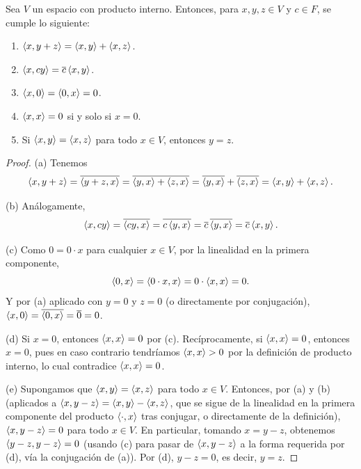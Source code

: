 \documentclass[12pt,a4paper]{book}
\begin{document}
    \begin{teorema}
        Sea $V$ un espacio con producto interno. Entonces, para $x,y,z\in V$ y $c\in F$, se cumple lo siguiente:
        \begin{enumerate}[label=(\alph*)]
            \item $\left\langle x, y+z \right\rangle=\left\langle x, y \right\rangle+\left\langle x, z \right\rangle$.
            \item $\left\langle x, cy \right\rangle=\overline{c}\left\langle x, y \right\rangle$.
            \item $\left\langle x, 0 \right\rangle=\left\langle 0, x \right\rangle=0$.
            \item $\left\langle x, x \right\rangle=0$ si y solo si $x=0$.
            \item Si $\left\langle x, y \right\rangle=\left\langle x, z \right\rangle$ para todo $x\in V$, entonces $y=z$.
        \end{enumerate}
    \end{teorema}

    \begin{proof}
        (a) Tenemos
        \begin{equation*}
            \left\langle x, y+z \right\rangle=\overline{\left\langle y+z, x \right\rangle}=\overline{\left\langle y, x \right\rangle+\left\langle z, x \right\rangle}=\overline{\left\langle y, x \right\rangle}+\overline{\left\langle z, x \right\rangle}=\left\langle x, y \right\rangle+\left\langle x, z \right\rangle.
        \end{equation*}

        (b) Análogamente,
        \begin{equation*}
            \left\langle x, cy \right\rangle=\overline{\left\langle cy, x \right\rangle}=\overline{c\left\langle y, x \right\rangle}=\overline{c}\,\overline{\left\langle y, x \right\rangle}=\overline{c}\left\langle x, y \right\rangle.
        \end{equation*}

        (c) Como $0=0\cdot x$ para cualquier $x\in V$, por la linealidad en la primera componente,
        \begin{equation*}
            \left\langle 0, x \right\rangle=\left\langle 0\cdot x, x \right\rangle=0\cdot\left\langle x, x \right\rangle=0.
        \end{equation*}
        Y por (a) aplicado con $y=0$ y $z=0$ (o directamente por conjugación), $\left\langle x, 0 \right\rangle=\overline{\left\langle 0, x \right\rangle}=\overline{0}=0$.

        (d) Si $x=0$, entonces $\left\langle x, x \right\rangle=0$ por (c). Recíprocamente, si $\left\langle x, x \right\rangle=0$, entonces $x=0$, pues en caso contrario tendríamos $\left\langle x, x \right\rangle>0$ por la definición de producto interno, lo cual contradice $\left\langle x, x \right\rangle=0$.

        (e) Supongamos que $\left\langle x, y \right\rangle=\left\langle x, z \right\rangle$ para todo $x\in V$. Entonces, por (a) y (b) (aplicados a $\left\langle x, y-z \right\rangle=\left\langle x, y \right\rangle-\left\langle x, z \right\rangle$, que se sigue de la linealidad en la primera componente del producto $\left\langle \cdot, x \right\rangle$ tras conjugar, o directamente de la definición), $\left\langle x, y-z \right\rangle=0$ para todo $x\in V$. En particular, tomando $x=y-z$, obtenemos $\left\langle y-z, y-z \right\rangle=0$ (usando (c) para pasar de $\left\langle x, y-z \right\rangle$ a la forma requerida por (d), vía la conjugación de (a)). Por (d), $y-z=0$, es decir, $y=z$.
    \end{proof}
\end{document}
